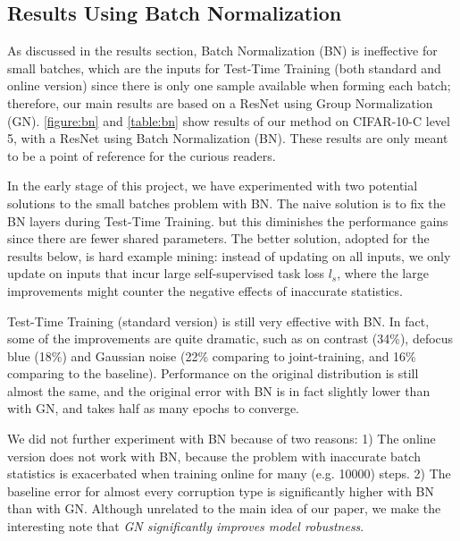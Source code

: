 \subsection{Results Using Batch Normalization}
As discussed in the results section, Batch Normalization (BN) is ineffective for small batches, which are the inputs for Test-Time Training (both standard and online version) since there is only one sample available when forming each batch; therefore, our main results are based on a ResNet using Group Normalization (GN). 
\autoref{figure:bn} and \autoref{table:bn} show results of our method on CIFAR-10-C level 5, with a ResNet using Batch Normalization (BN). These results are only meant to be a point of reference for the curious readers.

In the early stage of this project, we have experimented with two potential solutions to the small batches problem with BN.  The naive solution is to fix the BN layers during Test-Time Training. but this diminishes the performance gains since there are fewer shared parameters. 
The better solution, adopted for the results below, is hard example mining: instead of updating on all inputs, we only update on inputs that incur large self-supervised task loss $l_s$,
where the large improvements might counter the negative effects of inaccurate statistics.

Test-Time Training (standard version) is still very effective with BN. 
In fact, some of the improvements are quite dramatic, such as on contrast (34\%), defocus blue (18\%) and Gaussian noise (22\% comparing to joint-training, and 16\% comparing to the baseline). Performance on the original distribution is still almost the same, and the original error with BN is in fact slightly lower than with GN, and takes half as many epochs to converge.

We did not further experiment with BN because of two reasons:
1) The online version does not work with BN, because the problem with inaccurate batch statistics is exacerbated when training online for many (e.g. 10000) steps. 2) The baseline error for almost every corruption type is significantly higher with BN than with GN. Although unrelated to the main idea of our paper, we make the interesting note that \emph{GN significantly improves model robustness}.

